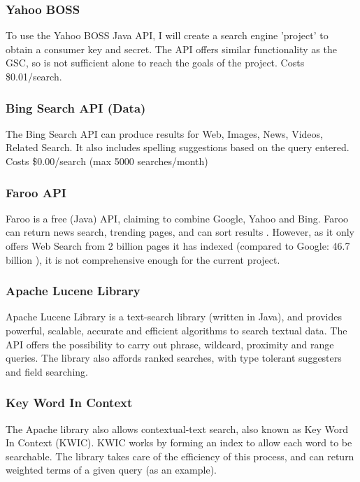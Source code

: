 \documentclass[a4paper, 11pt]{article}
\begin{document}
\subsubsection{Yahoo BOSS}
To use the Yahoo BOSS Java API, I will create a search engine 'project' to obtain a consumer key and secret. The API offers similar functionality as the GSC, so is not sufficient alone to reach the goals of the project. Costs \$0.01/search.

\subsubsection{Bing Search API (Data)}
The Bing Search API can produce results for Web, Images, News, Videos, Related Search. It also includes spelling suggestions based on the query entered. Costs \$0.00/search (max 5000 searches/month)

\subsubsection{Faroo API}
Faroo is a free (Java) API, claiming to combine Google, Yahoo and Bing. Faroo can return news search, trending pages, and can sort results \cite{faroo}. However, as it only offers Web Search from 2 billion pages it has indexed (compared to Google: 46.7 billion \cite{websize}), it is not comprehensive enough for the current project.

\subsubsection{Apache Lucene Library}\label{apache}
Apache Lucene Library is a text-search library (written in Java), and provides powerful, scalable, accurate and efficient algorithms to search textual data. The API offers the possibility to carry out phrase, wildcard, proximity and range queries. The library also affords ranked searches, with type tolerant suggesters and field searching.

\subsubsection{Key Word In Context} \label{KWIC} 
The Apache library also allows contextual-text search, also known as Key Word In Context (KWIC)\cite{kwic}. KWIC works by forming an index to allow each word to be searchable. The library takes care of the efficiency of this process, and can return weighted terms of a given query (as an example).
\end{document}
